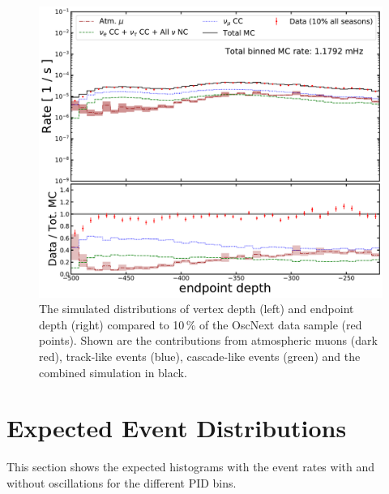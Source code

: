 \begin{appendices}
\begin{figure}[h]
    \includegraphics[width=0.75\linewidth]{figures/L7_SANTA_classifier_zend_14_bigger.pdf}
    \caption[The simulated distributions of vertex depth (left) and endpoint depth (right) compared to 10\,\% of the OscNext data sample]{The simulated distributions of vertex depth (left) and endpoint depth (right) compared to 10\,\% of the OscNext data sample (red points). Shown are the contributions from atmospheric muons (dark red), track-like events (blue), cascade-like events (green) and the combined simulation in black.}
    \label{fig:data_mc_zstart_zend}
\end{figure}


\chapter{Expected Event Distributions} \label{app:event_distributions}

This section shows the expected histograms with the event rates with and without oscillations for the different PID bins.


\end{appendices}
